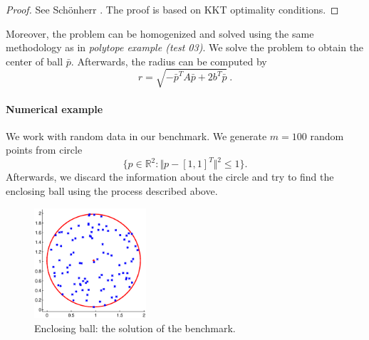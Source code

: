 \documentclass{article}
\theoremstyle{lemma}
\begin{document}
\begin{proof}
See Sch\"{o}nherr 
. The proof is based on KKT optimality conditions.
\end{proof}

Moreover, the problem can be homogenized and solved using the same methodology as in \emph{polytope example (test 03)}.
We solve the problem to obtain the center of ball $\bar{p}$. Afterwards, the radius can be computed by
\begin{displaymath}
 r = \sqrt{-\bar{p}^T A\bar{p} + 2 b^T \bar{p}} ~\mathrm{.}
\end{displaymath}


\paragraph{Numerical example}

We work with random data in our benchmark. We generate $m = 100$ random points from circle
\begin{displaymath}
 \lbrace p \in \mathbb{R}^2: \Vert p - [1, 1]^T \Vert^2 \leq 1 \rbrace. 
\end{displaymath}
Afterwards, we discard the information about the circle and try to find the enclosing ball using the process described above.

\begin{figure}[h!]
\begin{center}
\includegraphics[width=0.37\textwidth]{ball_solution.eps}
\caption[Enclosing ball: the solution of benchmark]{Enclosing ball: the solution of the benchmark.}
\label{fig:ball_solution}
\end{center}
\end{figure}
\end{document}
